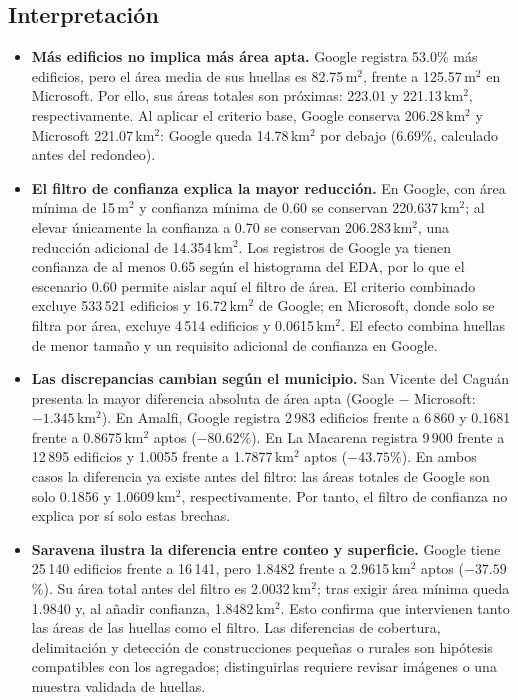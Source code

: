 \subsection{Interpretación}
\begin{itemize}
  \item \textbf{Más edificios no implica más área apta.} Google registra 53.0\% más edificios, pero el área media de sus huellas es 82.75\,m$^2$, frente a 125.57\,m$^2$ en Microsoft. Por ello, sus áreas totales son próximas: 223.01 y 221.13\,km$^2$, respectivamente. Al aplicar el criterio base, Google conserva 206.28\,km$^2$ y Microsoft 221.07\,km$^2$: Google queda 14.78\,km$^2$ por debajo (6.69\%, calculado antes del redondeo).
  \item \textbf{El filtro de confianza explica la mayor reducción.} En Google, con área mínima de 15\,m$^2$ y confianza mínima de 0.60 se conservan 220.637\,km$^2$; al elevar únicamente la confianza a 0.70 se conservan 206.283\,km$^2$, una reducción adicional de 14.354\,km$^2$. Los registros de Google ya tienen confianza de al menos 0.65 según el histograma del EDA, por lo que el escenario 0.60 permite aislar aquí el filtro de área. El criterio combinado excluye 533\,521 edificios y 16.72\,km$^2$ de Google; en Microsoft, donde solo se filtra por área, excluye 4\,514 edificios y 0.0615\,km$^2$. El efecto combina huellas de menor tamaño y un requisito adicional de confianza en Google.
  \item \textbf{Las discrepancias cambian según el municipio.} San Vicente del Caguán presenta la mayor diferencia absoluta de área apta (Google $-$ Microsoft: $-1.345$\,km$^2$). En Amalfi, Google registra 2\,983 edificios frente a 6\,860 y 0.1681 frente a 0.8675\,km$^2$ aptos ($-80.62$\%). En La Macarena registra 9\,900 frente a 12\,895 edificios y 1.0055 frente a 1.7877\,km$^2$ aptos ($-43.75$\%). En ambos casos la diferencia ya existe antes del filtro: las áreas totales de Google son solo 0.1856 y 1.0609\,km$^2$, respectivamente. Por tanto, el filtro de confianza no explica por sí solo estas brechas.
  \item \textbf{Saravena ilustra la diferencia entre conteo y superficie.} Google tiene 25\,140 edificios frente a 16\,141, pero 1.8482 frente a 2.9615\,km$^2$ aptos ($-37.59$\%). Su área total antes del filtro es 2.0032\,km$^2$; tras exigir área mínima queda 1.9840 y, al añadir confianza, 1.8482\,km$^2$. Esto confirma que intervienen tanto las áreas de las huellas como el filtro. Las diferencias de cobertura, delimitación y detección de construcciones pequeñas o rurales son hipótesis compatibles con los agregados; distinguirlas requiere revisar imágenes o una muestra validada de huellas.

\end{itemize}
